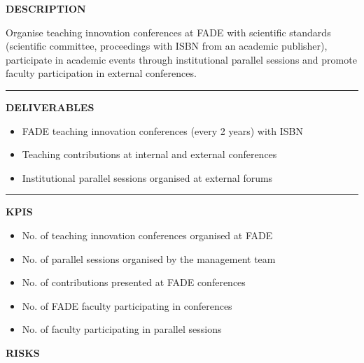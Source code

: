 \documentclass[11pt,a4paper]{scrreprt}
\newcommand{\fieldlabel}[1]{%
  {\footnotesize\sffamily\bfseries\color{mutedcolor}\MakeUppercase{#1}}\par\nopagebreak[4]
}
\newcommand{\fieldsep}{\vspace{3pt}\noindent\textcolor{bordercolor}{\rule{\linewidth}{0.4pt}}\vspace{3pt}\par}
\begin{document}
\vspace{8pt}

\begin{tcolorbox}[pabox={aacolor}{A.P.4.2 \enspace\textbullet\enspace Promotion and Dissemination of FADE Teaching Innovation}]

\fieldlabel{Description}
{\small Organise teaching innovation conferences at FADE with scientific standards (scientific committee, proceedings with ISBN from an academic publisher), participate in academic events through institutional parallel sessions and promote faculty participation in external conferences.}\par
\fieldsep
\fieldlabel{Deliverables}
{\small \begin{itemize}[noitemsep,topsep=2pt]
\item FADE teaching innovation conferences (every 2 years) with ISBN
\item Teaching contributions at internal and external conferences
\item Institutional parallel sessions organised at external forums
\end{itemize}}\par
\fieldsep
\fieldlabel{KPIs}
{\small \begin{itemize}[noitemsep,topsep=2pt]
\item No. of teaching innovation conferences organised at FADE
\item No. of parallel sessions organised by the management team
\item No. of contributions presented at FADE conferences
\item No. of FADE faculty participating in conferences
\item No. of faculty participating in parallel sessions
\end{itemize}}\par
\end{tcolorbox}
\begin{tcolorbox}[riskbox]
{\footnotesize\sffamily\bfseries\color{red!50!black} RISKS}\par{}
\end{tcolorbox}
\end{document}
